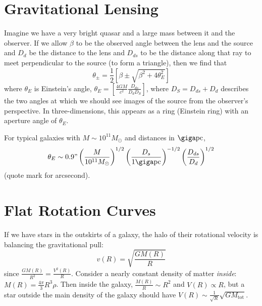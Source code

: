 \documentclass[a4paper,twoside,master.tex]{subfiles}
\begin{document}
\section{Gravitational Lensing}\label{sec:gravitational_lensing}

Imagine we have a very bright quasar and a large mass between it and the observer. If we allow $ \beta $ to be the observed angle between the lens and the source and $ D_d $ be the distance to the lens and $ D_{ds} $ to be the distance along that ray to meet perpendicular to the source (to form a triangle), then we find that
\begin{equation}
    \theta_{\pm} = \frac{1}{2} \left[ \beta \pm \sqrt{\beta^2 + 4 \theta^2_E} \right]
\end{equation}
where $ \theta_E $ is Einstein's angle, $ \theta_E = \left[ \frac{4 G M}{c^2} \frac{D_{ds}}{D_{d} D_{S}} \right] $, where $ D_S = D_{ds} + D_d $ describes the two angles at which we should see images of the source from the observer's perspective. In three-dimensions, this appears as a ring (Einstein ring) with an aperture angle of $ \theta_E $.

For typical galaxies with $ M \sim 10^{11} M_{\odot} $ and distances in $ \giga \text{pc} $,
\begin{equation}
    \theta_E \sim 0.9" \left( \frac{M}{10^{11} M_{\odot}} \right)^{1/2} \left( \frac{D_s}{1\giga \text{pc}} \right)^{-1/2} \left( \frac{D_{ds}}{D_d} \right)^{1/2}
\end{equation}
(quote mark for arcsecond).

\section{Flat Rotation Curves}\label{sec:flat_rotation_curves}

If we have stars in the outskirts of a galaxy, the halo of their rotational velocity is balancing the gravitational pull:
\begin{equation}
    v(R) = \sqrt{\frac{GM(R)}{R}}
\end{equation}
since $ \frac{G M(R)}{R^2} = \frac{V^2(R)}{R} $. Consider a nearly constant density of matter \textit{inside}: $ M(R) = \frac{4 \pi}{3} R^3 \rho $. Then inside the galaxy, $ \frac{M(R)}{R} \sim R^2 $ and $ V(R) \propto R $, but a star outside the main density of the galaxy should have $ V(R) \sim \frac{1}{\sqrt{R}} \sqrt{GM_{\text{tot}}} $.
\end{document}
